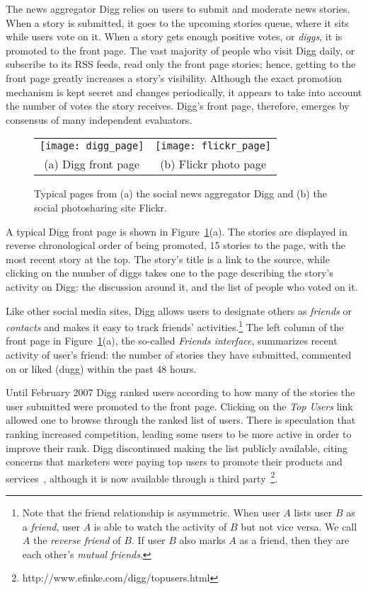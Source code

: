 \documentclass[]{article}
\newcommand{\figref}[1]{Figure~\ref{#1}}
\begin{document}
The news aggregator Digg relies on users to submit
 and moderate news stories. When a story is submitted, it goes to the
upcoming stories queue, where it sits while users vote on it.
When a story gets enough positive votes, or \emph{diggs}, it is promoted to the front page.
The vast majority  of people who visit Digg daily, or subscribe to
its RSS feeds, read only the front page stories; hence, getting to
the front page greatly increases a story's visibility. Although
the exact promotion mechanism is kept secret and changes
periodically, it appears to take into account the number of votes
the story receives. Digg's  front page, therefore, emerges by
consensus of many independent evaluators.


\begin{figure}
\begin{tabular}{cc}
\texttt{[image: digg\_page]} &
\texttt{[image: flickr\_page]} \\
(a) Digg front page & (b) Flickr photo page
\end{tabular}
\caption {Typical pages from (a) the social news aggregator Digg and
(b) the social photosharing site Flickr.
 } \label{fig:pages}
\end{figure}


A typical Digg front page is shown in \figref{fig:pages}(a).
The stories are displayed in reverse chronological order of being
promoted, 15 stories to the page, with the most recent story at the
top. The story's title is a link to the source, while clicking on
the number of diggs takes one to the page describing the story's
activity on Digg: the discussion around it, and the list of people who
voted on it.

Like other social media sites, Digg allows users to designate others
as \emph{friends} or \emph{contacts} and makes it easy
to track friends' activities.\footnote{Note
that the friend relationship is asymmetric. When user $A$ lists user
$B$ as a \emph{friend}, user $A$ is able to watch the activity of
$B$ but not vice versa. We call $A$ the \emph{reverse friend} of
$B$. If user $B$ also marks $A$ as a friend, then they are each other's
\emph{mutual friends}.} The left column of the front page in
\figref{fig:pages}(a), the so-called \emph{Friends interface}, summarizes
recent activity of user's friend: the number of stories they have
submitted, commented on or liked (dugg) within the past 48 hours.

Until February 2007 Digg ranked users
according to how many of the stories the user submitted were
promoted to the front page.  Clicking on the \emph{Top
Users} link allowed one to browse through the ranked list of users.
There is speculation that ranking increased competition,
leading some users to be more active in order to improve their
rank.  Digg discontinued making the list publicly
available, citing concerns that marketers were paying top users to
promote their products and services~\cite{WSJ}, although it is now
available through a third party~\footnote{http://www.efinke.com/digg/topusers.html}.
\end{document}
